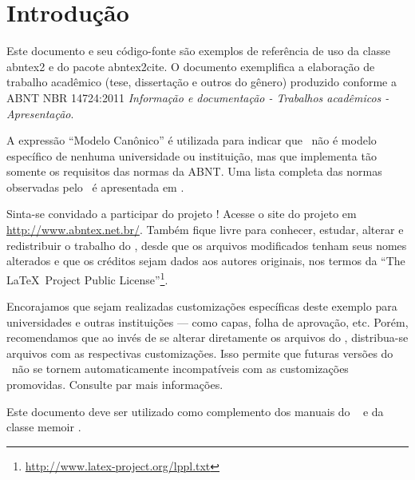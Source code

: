 \documentclass[
	12pt,				%
	openright,			%
	twoside,			%
	a4paper,			%
	english,			%
	french,				%
	spanish,			%
	brazil				%
	]{abntex2}
\begin{document}
\textual

\chapter*[Introdução]{Introdução}

Este documento e seu código-fonte são exemplos de referência de uso da classe
\textsf{abntex2} e do pacote \textsf{abntex2cite}. O documento 
exemplifica a elaboração de trabalho acadêmico (tese, dissertação e outros do
gênero) produzido conforme a ABNT NBR 14724:2011 \emph{Informação e documentação
- Trabalhos acadêmicos - Apresentação}.

A expressão ``Modelo Canônico'' é utilizada para indicar que \abnTeX\ não é
modelo específico de nenhuma universidade ou instituição, mas que implementa tão
somente os requisitos das normas da ABNT. Uma lista completa das normas
observadas pelo \abnTeX\ é apresentada em .

Sinta-se convidado a participar do projeto \abnTeX! Acesse o site do projeto em
\url{http://www.abntex.net.br/}. Também fique livre para conhecer,
estudar, alterar e redistribuir o trabalho do \abnTeX, desde que os arquivos
modificados tenham seus nomes alterados e que os créditos sejam dados aos
autores originais, nos termos da ``The \LaTeX\ Project Public
License''\footnote{\url{http://www.latex-project.org/lppl.txt}}.

Encorajamos que sejam realizadas customizações específicas deste exemplo para
universidades e outras instituições --- como capas, folha de aprovação, etc.
Porém, recomendamos que ao invés de se alterar diretamente os arquivos do
\abnTeX, distribua-se arquivos com as respectivas customizações.
Isso permite que futuras versões do \abnTeX~não se tornem automaticamente
incompatíveis com as customizações promovidas. Consulte
 par mais informações.

Este documento deve ser utilizado como complemento dos manuais do \abnTeX\ 
\cite{abntex2classe,abntex2cite,abntex2cite-alf} e da classe \textsf{memoir}
\cite{memoir}. 
\end{document}
